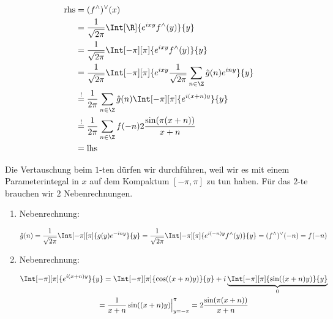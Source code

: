 \begin{solution}
\begin{enumerate}[label = \arabic*.]
    \begin{align*}
        \mathrm{rhs}
        & =
        (f^\wedge)^\vee(x) \\
        & =
        \frac{1}{\sqrt{2 \pi}}
        \Int[\R]
        {
            e^{i x y}
            f^\wedge(y)
        }{y} \\
        & =
        \frac{1}{\sqrt{2 \pi}}
        \Int[-\pi][\pi]
        {
            e^{i x y}
            f^\wedge(y)
        }{y} \\
        & =
        \frac{1}{\sqrt{2 \pi}}
        \Int[-\pi][\pi]
        {
            e^{i x y}
            \frac{1}{\sqrt{2 \pi}}
            \sum_{n \in \Z}
            \hat g(n)
            e^{i n y}
        }{y} \\
        & \stackrel{!}{=}
        \frac{1}{2 \pi}
        \sum_{n \in \Z}
        \hat g(n)
        \Int[-\pi][\pi]
        {
            e^{i (x + n) y}
        }{y} \\
        & \stackrel{!}{=}
        \frac{1}{2 \pi}
        \sum_{n \in \Z}
        f(-n)
        2 \frac{\sin(\pi (x + n))}{x + n} \\
        & =
        \mathrm{lhs}
    \end{align*}

    Die Vertauschung beim $1$-ten \Quote{!} dürfen wir durchführen, weil wir es mit einem Parameterintegal in $x$ auf dem Kompaktum $[-\pi, \pi]$ zu tun haben.
    Für das $2$-te brauchen wir $2$ Nebenrechnungen.

    \begin{enumerate}[label = \arabic*.]

        \item Nebenrechnung:
        
        \begin{align*}
            \hat g(n)
            =
            \frac{1}{\sqrt{2 \pi}}
            \Int[-\pi][\pi]
            {
                g(y)
                e^{-i n y}
            }{y}
            =
            \frac{1}{\sqrt{2 \pi}}
            \Int[-\pi][\pi]
            {
                e^{i (-n) y}
                f^\wedge(y)
            }{y}
            =
            (f^\wedge)^\vee(-n)
            =
            f(-n)
        \end{align*}

        \item Nebenrechnung:

        \begin{multline*}
            \Int[-\pi][\pi]
            {
                e^{i (x + n) y}
            }{y}
            =
            \Int[-\pi][\pi]
            {
                \cos((x + n) y)
            }{y}
            +
            i
            \underbrace
            {
                \Int[-\pi][\pi]
                {
                    \sin((x + n) y)
                }{y}
            }_0 \\
            =
            \frac{1}{x + n}
            \sin((x + n) y) \Big |_{y = -\pi}^\pi
            =
            2 \frac{\sin(\pi (x + n))}{x + n}
        \end{multline*}
    

\end{enumerate}
\end{enumerate}
\end{solution}
